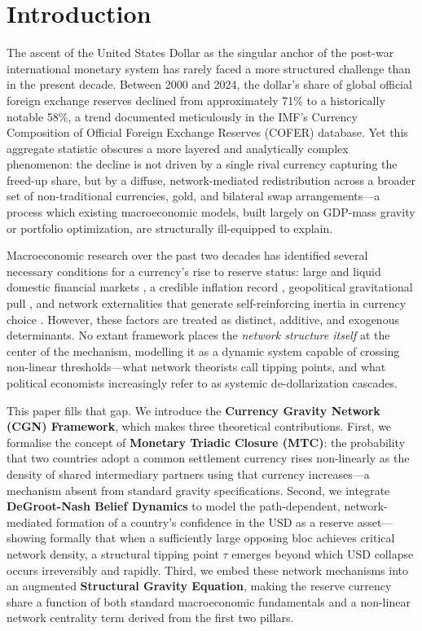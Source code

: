 \documentclass[12pt, letterpaper]{article}
\theoremstyle{definition}
\begin{document}
\section{Introduction}
\label{sec:intro}

The ascent of the United States Dollar as the singular anchor of the post-war international monetary system has rarely faced a more structured challenge than in the present decade. Between 2000 and 2024, the dollar's share of global official foreign exchange reserves declined from approximately 71\% to a historically notable 58\%, a trend documented meticulously in the IMF's Currency Composition of Official Foreign Exchange Reserves (COFER) database. Yet this aggregate statistic obscures a more layered and analytically complex phenomenon: the decline is not driven by a single rival currency capturing the freed-up share, but by a diffuse, network-mediated redistribution across a broader set of non-traditional currencies, gold, and bilateral swap arrangements---a process which existing macroeconomic models, built largely on GDP-mass gravity or portfolio optimization, are structurally ill-equipped to explain.

Macroeconomic research over the past two decades has identified several necessary conditions for a currency's rise to reserve status: large and liquid domestic financial markets \citep{chinn2005euro}, a credible inflation record \citep{frankel2012internationalization}, geopolitical gravitational pull \citep{eichengreen2022sanctions}, and network externalities that generate self-reinforcing inertia in currency choice \citep{krugman1984trade}. However, these factors are treated as distinct, additive, and exogenous determinants. No extant framework places the \textit{network structure itself} at the center of the mechanism, modelling it as a dynamic system capable of crossing non-linear thresholds---what network theorists call tipping points, and what political economists increasingly refer to as systemic de-dollarization cascades.

This paper fills that gap. We introduce the \textbf{Currency Gravity Network (CGN) Framework}, which makes three theoretical contributions. First, we formalise the concept of \textbf{Monetary Triadic Closure (MTC)}: the probability that two countries adopt a common settlement currency rises non-linearly as the density of shared intermediary partners using that currency increases---a mechanism absent from standard gravity specifications. Second, we integrate \textbf{DeGroot-Nash Belief Dynamics} to model the path-dependent, network-mediated formation of a country's confidence in the USD as a reserve asset---showing formally that when a sufficiently large opposing bloc achieves critical network density, a structural tipping point $\tau$ emerges beyond which USD collapse occurs irreversibly and rapidly. Third, we embed these network mechanisms into an augmented \textbf{Structural Gravity Equation}, making the reserve currency share a function of both standard macroeconomic fundamentals and a non-linear network centrality term derived from the first two pillars.
\end{document}
